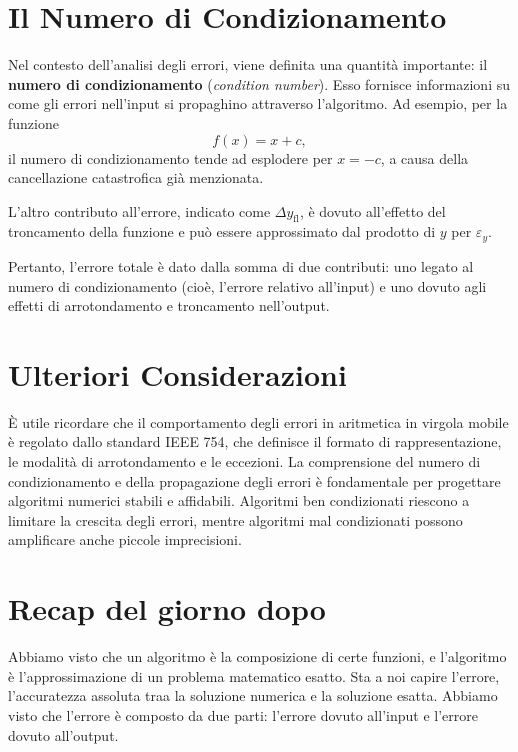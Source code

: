 \documentclass[letterpaper,12pt]{article}
\begin{document}
\section*{Il Numero di Condizionamento}

Nel contesto dell'analisi degli errori, viene definita una quantità importante: il \textbf{numero di condizionamento} (\emph{condition number}). Esso fornisce informazioni su come gli errori nell'input si propaghino attraverso l'algoritmo. Ad esempio, per la funzione
\[
f(x) = x + c,
\]
il numero di condizionamento tende ad esplodere per $x=-c$, a causa della cancellazione catastrofica già menzionata.

L'altro contributo all'errore, indicato come $\Delta y_{\operatorname{fl}}$, è dovuto all'effetto del troncamento della funzione e può essere approssimato dal prodotto di $y$ per $\varepsilon_y$.

Pertanto, l'errore totale è dato dalla somma di due contributi: uno legato al numero di condizionamento (cioè, l'errore relativo all'input) e uno dovuto agli effetti di arrotondamento e troncamento nell'output.

\section*{Ulteriori Considerazioni}

È utile ricordare che il comportamento degli errori in aritmetica in virgola mobile è regolato dallo standard IEEE 754, 
che definisce il formato di rappresentazione, le modalità di arrotondamento e le eccezioni. La comprensione del numero 
di condizionamento e della propagazione degli errori è fondamentale per progettare algoritmi numerici stabili e affidabili.
Algoritmi ben condizionati riescono a limitare la crescita degli errori, mentre algoritmi mal condizionati possono 
amplificare anche piccole imprecisioni.

\section{Recap del giorno dopo}
Abbiamo visto che un algoritmo è la composizione di certe funzioni, e l'algoritmo è l'approssimazione di un problema 
matematico esatto. Sta a noi capire l'errore, l'accuratezza assoluta traa la soluzione numerica e la soluzione esatta.
Abbiamo visto che l'errore è composto da due parti: l'errore dovuto all'input e l'errore dovuto all'output. 
\end{document}
